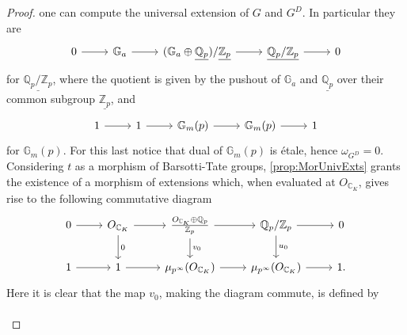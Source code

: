 \begin{proof}
	one can compute the universal extension of $G$ and $G^D$.
	In particular they are
	\begin{equation*}
	\begin{tikzcd}
		0 \arrow[r, "", rightarrow] &
		\mathbb{G}_a \arrow[r, "", rightarrow] &
		(\mathbb{G}_a \oplus \underline{\mathbb{Q}_p}) / \underline{\mathbb{Z}_{p}} 
		\arrow[r, "", rightarrow] &
		\underline{\mathbb{Q}_p/\mathbb{Z}_{p}} \arrow[r, "", rightarrow] &
		0
	\end{tikzcd}
	\end{equation*}
	for $\underline{\mathbb{Q}_p/\mathbb{Z}_{p}}$, where the quotient
	is given by the pushout of $\mathbb{G}_a$ and $\underline{\mathbb{Q}_p}$
	over their common subgroup $\underline{\mathbb{Z}_{p}}$, and
	\begin{equation*}
	\begin{tikzcd}
		1 \arrow[r, "", rightarrow] &
		1 \arrow[r, "", rightarrow] &
		\mathbb{G}_m(p) \arrow[r, "", rightarrow] &
		\mathbb{G}_m(p) \arrow[r, "", rightarrow] &
		1
	\end{tikzcd}
	\end{equation*}
	for $\mathbb{G}_m(p)$.
	For this last notice that dual of $\mathbb{G}_m(p)$
	is étale, hence $\omega_{G^D} = 0$.
	Considering $t$ as a morphism of Barsotti-Tate groups, \cref{prop:MorUnivExts}
	grants the existence of a morphism of extensions which, when
	evaluated at $O_{\mathbb{C}_K}$, gives rise to the following commutative diagram
	\begin{equation*}
	\begin{tikzcd}
		0 \arrow[r, "", rightarrow] &
		O_{\mathbb{C}_K} 
		\arrow[d, "0", rightarrow] 
		\arrow[r, "", rightarrow] &
		\frac{ O_{\mathbb{C}_K} \oplus \mathbb{Q}_p }{ \mathbb{Z}_{p} }
		\arrow[d, "v_0", rightarrow] 
		\arrow[r, "", rightarrow] &
		\mathbb{Q}_p/\mathbb{Z}_{p}
		\arrow[d, "u_0", rightarrow] 
		\arrow[r, "", rightarrow] &
		0 \\
		1 \arrow[r, "", rightarrow] &
		1 \arrow[r, "", rightarrow] &
		\mu_{p^\infty}(O_{\mathbb{C}_K})
		\arrow[r, "", rightarrow] &
		\mu_{p^\infty}(O_{\mathbb{C}_K})
		\arrow[r, "", rightarrow] &
		1
	.\end{tikzcd}
	\end{equation*}
	Here it is clear that the map $v_0$, making the diagram commute, is defined by
	\begin{equation*}
	\begin{tikzcd}[row sep = 0ex
		,/tikz/column 1/.append style={anchor=base east}
		,/tikz/column 2/.append style={anchor=base west}]

\end{tikzcd}
\end{equation*}
\end{proof}
